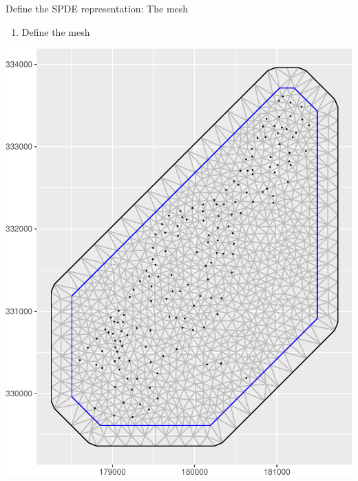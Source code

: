 \documentclass[
  ignorenonframetext,
]{beamer}
\newenvironment{Shaded}{\begin{snugshade}}{\end{snugshade}}
\newcommand{\AttributeTok}[1]{\textcolor[rgb]{0.77,0.63,0.00}{#1}}
\newcommand{\DecValTok}[1]{\textcolor[rgb]{0.00,0.00,0.81}{#1}}
\newcommand{\FunctionTok}[1]{\textcolor[rgb]{0.00,0.00,0.00}{#1}}
\newcommand{\NormalTok}[1]{#1}
\newcommand{\OtherTok}[1]{\textcolor[rgb]{0.56,0.35,0.01}{#1}}
\newcommand{\SpecialCharTok}[1]{\textcolor[rgb]{0.00,0.00,0.00}{#1}}
\providecommand{\tightlist}{%
  \setlength{\itemsep}{0pt}\setlength{\parskip}{0pt}}
\begin{document}
\begin{frame}[fragile]{Define the SPDE representation: The mesh}
\protect\hypertarget{define-the-spde-representation-the-mesh}{}
\begin{enumerate}
\tightlist
\item
  Define the mesh \small
\end{enumerate}

\begin{Shaded}
\end{Shaded}

\begin{center}\includegraphics[width=0.4\linewidth]{Part3_Spatial_files/figure-beamer/unnamed-chunk-11-1} \end{center}
\normalsize
\end{frame}
\end{document}

